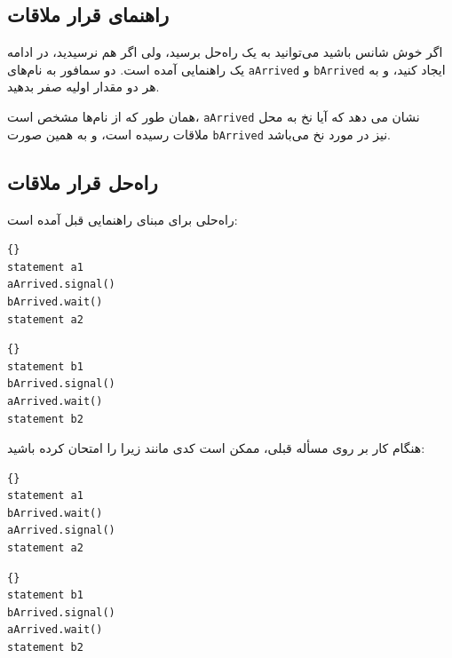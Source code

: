 \documentclass{book}
\newcommand{\clearemptydoublepage}{\newpage\cleardoublepage}
\begin{document}
 \clearemptydoublepage
\subsection{راهنمای قرار ملاقات}
	

اگر خوش شانس باشید می‌توانید به یک راه‌حل برسید، ولی اگر هم نرسیدید، در ادامه یک راهنمایی آمده است. 
دو سمافور به نام‌های \texttt{aArrived} و \texttt{bArrived} ایجاد کنید، و به هر دو مقدار اولیه صفر بدهید. 

همان طور که از نام‌ها مشخص است، \texttt{aArrived} نشان می دهد که آیا نخ  به محل ملاقات رسیده است، 
و به همین صورت \texttt{bArrived} نیز در مورد نخ  می‌باشد.

\clearemptydoublepage
\subsection{راه‌حل قرار ملاقات }

    راه‌حلی برای مبنای راهنمایی قبل آمده است: 

\begin{latin}
\begin{minipage}[t]{2in}
\begin{latin}
\begin{lstlisting}[title=\rl{نخ \lr{A}}]{}
statement a1
aArrived.signal()
bArrived.wait()
statement a2
\end{lstlisting}
\end{latin}
\end{minipage}
\hfill
\begin{minipage}[t]{2in}
\begin{latin}
\begin{lstlisting}[title=\rl{نخ \lr{B}}]{}
statement b1
bArrived.signal()
aArrived.wait()
statement b2
\end{lstlisting}
\end{latin}
\end{minipage}
\end{latin}

    هنگام کار بر روی مسأله قبلی، ممکن است کدی مانند زیرا را امتحان کرده باشید:

\begin{latin}
\begin{minipage}[t]{2in}
\begin{latin}
\begin{lstlisting}[title=\rl{نخ \lr{A}}]{}
statement a1
bArrived.wait()
aArrived.signal()
statement a2
\end{lstlisting}
\end{latin}
\end{minipage}
\hfill
\begin{minipage}[t]{2in}
\begin{latin}
\begin{lstlisting}[title=\rl{نخ \lr{B}}]{}
statement b1
bArrived.signal()
aArrived.wait()
statement b2
\end{lstlisting}
\end{latin}
\end{minipage}
\end{latin}
\end{document}
